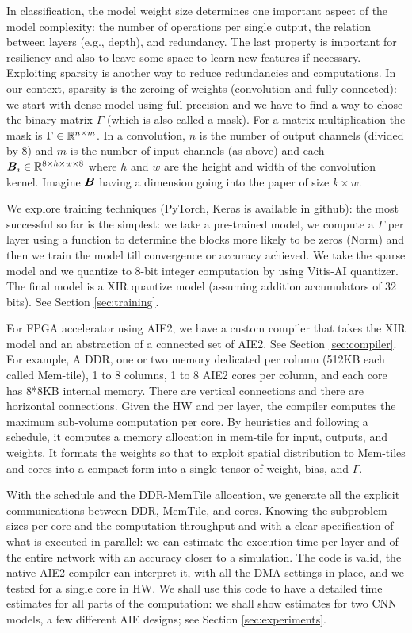 \documentclass[conference]{IEEEtran}
\begin{document}
In classification, the model weight size determines one important
aspect of the model complexity: the number of operations per single
output, the relation between layers (e.g., depth), and redundancy. The
last property is important for resiliency and also to leave some space
to learn new features if necessary. Exploiting sparsity is another way
to reduce redundancies and computations. In our context, sparsity is
the zeroing of weights (convolution and fully connected): we start
with dense model using full precision and we have to find a way to
chose the binary matrix $\Gamma$ (which is also called a mask). For a
matrix multiplication the mask is $\Gamma \in \mathbb{R}^{n\times m}$. In a
convolution, $n$ is the number of output channels (divided by 8) and
$m$ is the number of input channels (as above) and each ${\boldsymbol B}_i \in
\mathbb{R}^{8\times h \times w \times 8}$ where $h$ and $w$ are the height and
width of the convolution kernel. Imagine ${\boldsymbol B}$ having a dimension
going into the paper of size $k \times w$.

We explore training techniques (PyTorch, Keras is available in
github): the most successful so far is the simplest: we take a
pre-trained model, we compute a $\Gamma$ per layer using a function to
determine the blocks more likely to be zeros (Norm) and then we train
the model till convergence or accuracy achieved. We take the sparse
model and we quantize to 8-bit integer computation by using Vitis-AI
quantizer. The final model is a XIR quantize model (assuming addition
accumulators of 32 bits). See Section \ref{sec:training}.

For FPGA accelerator using AIE2, we have a custom compiler that takes
the XIR model and an abstraction of a connected set of AIE2. See
Section \ref{sec:compiler}. For example, A DDR, one or two memory
dedicated per column (512KB each called Mem-tile), 1 to 8 columns, 1
to 8 AIE2 cores per column, and each core has 8*8KB internal
memory. There are vertical connections and there are horizontal
connections. Given the HW and per layer, the compiler computes the
maximum sub-volume computation per core. By heuristics and following a
schedule, it computes a memory allocation in mem-tile for input,
outputs, and weights. It formats the weights so that to exploit
spatial distribution to Mem-tiles and cores into a compact form into a
single tensor of weight, bias, and $\Gamma$.

With the schedule and the DDR-MemTile allocation, we generate all the
explicit communications between DDR, MemTile, and cores. Knowing the
subproblem sizes per core and the computation throughput and with a
clear specification of what is executed in parallel: we can estimate
the execution time per layer and of the entire network with an
accuracy closer to a simulation. The code is valid, the native AIE2
compiler can interpret it, with all the DMA settings in place, and we
tested for a single core in HW.  We shall use this code to have a
detailed time estimates for all parts of the computation: we shall
show estimates for two CNN models, a few different AIE designs; see
Section \ref{sec:experiments}.
\end{document}
